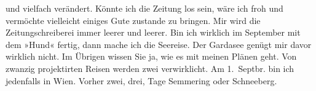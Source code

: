                und vielfach verändert. Könnte ich die Zeitung los sein, wäre ich froh und vermöchte
               vielleicht einiges Gute zustande zu bringen. Mir wird die Zeitungschreiberei immer
               leerer und leerer. Bin ich wirklich im September mit dem
                  »Hund« fertig, dann mache ich die Seereise.
               Der Gardasee genügt mir davor wirklich nicht.
               Im Übrigen wissen Sie ja, wie es mit meinen Plänen geht. Von zwanzig projektirten
               Reisen werden zwei verwirklicht. Am 1. Septbr. bin ich
               jedenfalls in Wien. Vorher zwei, drei, Tage Semmering oder Schneeberg.\pend
           
